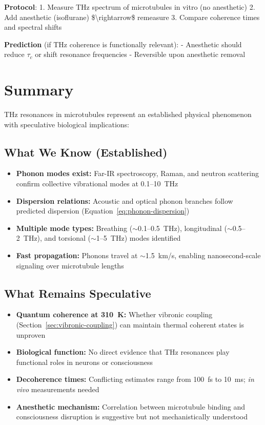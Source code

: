 \textbf{Protocol}: 1. Measure THz spectrum of microtubules in vitro (no
anesthetic) 2. Add anesthetic (isoflurane) \$\textbackslash rightarrow\$
remeasure 3. Compare coherence times and spectral shifts

\textbf{Prediction} (if THz coherence is functionally relevant): -
Anesthetic should reduce \(\tau_c\) or shift resonance frequencies -
Reversible upon anesthetic removal




\section{Summary}
\label{sec:summary}

THz resonances in microtubules represent an established physical phenomenon with speculative biological implications:

\subsection{What We Know (Established)}

\begin{itemize}
\item \textbf{Phonon modes exist:} Far-IR spectroscopy, Raman, and neutron scattering confirm collective vibrational modes at 0.1--10~THz
\item \textbf{Dispersion relations:} Acoustic and optical phonon branches follow predicted dispersion (Equation~\ref{eq:phonon-dispersion})
\item \textbf{Multiple mode types:} Breathing ($\sim$0.1--0.5~THz), longitudinal ($\sim$0.5--2~THz), and torsional ($\sim$1--5~THz) modes identified
\item \textbf{Fast propagation:} Phonons travel at $\sim$1.5~km/s, enabling nanosecond-scale signaling over microtubule lengths
\end{itemize}

\subsection{What Remains Speculative}

\begin{itemize}
\item \textbf{Quantum coherence at 310~K:} Whether vibronic coupling (Section~\ref{sec:vibronic-coupling}) can maintain thermal coherent states is unproven
\item \textbf{Biological function:} No direct evidence that THz resonances play functional roles in neurons or consciousness
\item \textbf{Decoherence times:} Conflicting estimates range from 100~fs to 10~ms; \textit{in vivo} measurements needed
\item \textbf{Anesthetic mechanism:} Correlation between microtubule binding and consciousness disruption is suggestive but not mechanistically understood
\end{itemize}

